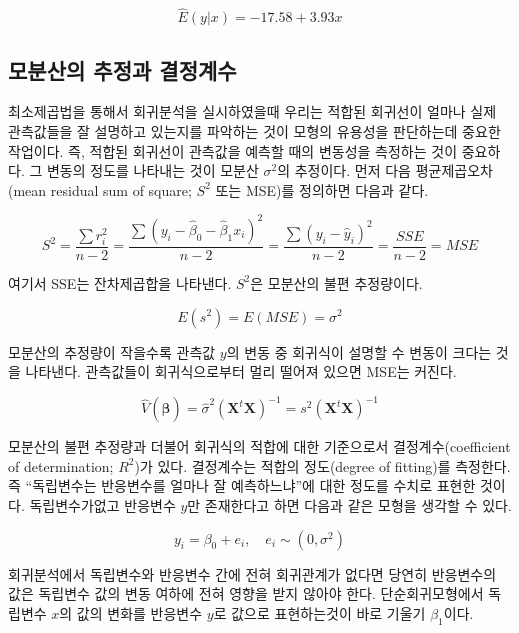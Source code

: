 \documentclass[
]{book}
\theoremstyle{definition}
\theoremstyle{definition}
\theoremstyle{definition}
\theoremstyle{remark}
\begin{document}
\[ \hat E(y | x) = −17.58 + 3.93 x \]

\hypertarget{uxbaa8uxbd84uxc0b0uxc758-uxcd94uxc815uxacfc-uxacb0uxc815uxacc4uxc218}{%
\subsection{모분산의 추정과 결정계수}\label{uxbaa8uxbd84uxc0b0uxc758-uxcd94uxc815uxacfc-uxacb0uxc815uxacc4uxc218}}

최소제곱법을 통해서 회귀분석을 실시하였을때 우리는 적합된 회귀선이 얼마나 실제 관측값들을 잘
설명하고 있는지를 파악하는 것이 모형의 유용성을 판단하는데 중요한 작업이다. 즉, 적합된 회귀선이 관측값을 예측할 때의 변동성을 측정하는 것이 중요하다. 그 변동의 정도를 나타내는 것이 모분산 \(\sigma^2\)의 추정이다. 먼저 다음 평균제곱오차(mean residual sum of square; \(S^2\) 또는 MSE)를 정의하면 다음과 같다.

\begin{equation} 
S^2 = \frac{\sum r^2_i}{n-2} = \frac{\sum(y_i-\hat \beta_0 - \hat \beta_1 x_i)^2}{n-2}
 = \frac{\sum(y_i-\hat y_i)^2}{n-2} = \frac{SSE}{n-2} = MSE
\label{eq:rss}
\end{equation}

여기서 SSE는 잔차제곱합을 나타낸다. \(S^2\)은 모분산의 불편 추정량이다.

\[ E(s^2) = E(MSE) =\sigma^2 \]

모분산의 추정량이 작을수록 관측값 \(y\)의 변동 중 회귀식이 설명할 수 변동이 크다는 것을 나타낸다. 관측값들이 회귀식으로부터 멀리 떨어져 있으면 MSE는 커진다.

\[ \hat V ( \hat {\bm \beta }) = \hat \sigma^2 (\bm X^t \bm X)^{-1} = s^2(\bm X^t \bm X)^{-1} \]

모분산의 불편 추정량과 더불어 회귀식의 적합에 대한 기준으로서 결정계수(coefficient of determination; \(R^2\))가 있다. 결정계수는 적합의 정도(degree of fitting)를 측정한다. 즉 ``독립변수는 반응변수를 얼마나 잘 예측하느냐''에 대한 정도를 수치로 표현한 것이다. 독립변수가없고 반응변수 \(y\)만 존재한다고 하면 다음과 같은 모형을 생각할 수 있다.

\begin{equation}
y_i = \beta_0 +e_i, \quad e_i \sim (0,\sigma^2) 
\label{eq:meanmodel}
\end{equation}

회귀분석에서 독립변수와 반응변수 간에 전혀 회귀관계가 없다면 당연히 반응변수의 값은 독립변수 값의 변동 여하에 전혀 영향을 받지 않아야 한다. 단순회귀모형에서 독립변수 \(x\)의 값의 변화를 반응변수 \(y\)로 값으로 표현하는것이 바로 기울기 \(\beta_1\)이다.
\end{document}
